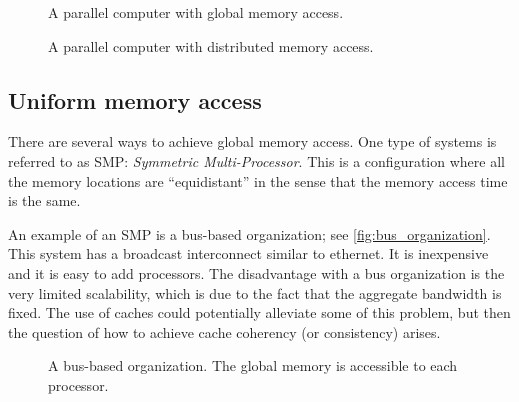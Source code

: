 \begin{figure}
  \centering
  
  \caption{A parallel computer with global memory access.}
  \label{fig:multiprocess1}
\end{figure}

\begin{figure}
  \centering
  
  \caption{A parallel computer with distributed memory access.}
  \label{fig:multiprocess2}
\end{figure}

\subsection{Uniform memory access}

There are several ways to achieve global memory access. One type of systems is
referred to as SMP: \emph{Symmetric Multi-Processor}. This is a configuration
where all the memory locations are ``equidistant'' in the sense that the memory
access time is the same.

An example of an SMP is a bus-based organization; see
\autoref{fig:bus_organization}. This system has a broadcast interconnect similar
to ethernet. It is inexpensive and it is easy to add processors. The
disadvantage with a bus organization is the very limited scalability, which is
due to the fact that the aggregate bandwidth is fixed. The use of caches could
potentially alleviate some of this problem, but then the question of how to
achieve cache coherency (or consistency) arises.

\begin{figure}
  \centering
  \caption{
    A bus-based organization. The global memory is accessible to each processor.
  }
  \label{fig:bus_organization}
\end{figure}

